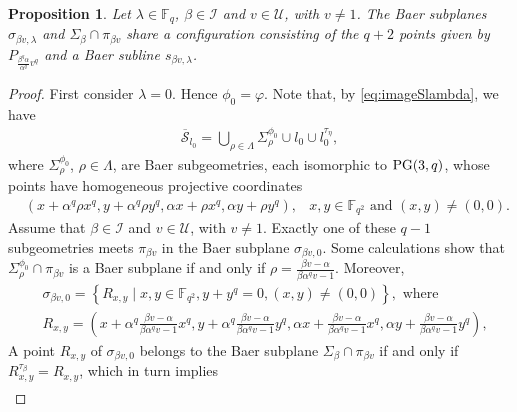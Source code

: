 \documentclass[11pt]{article}
\newtheorem{prop}[theorem]{Proposition}
\theoremstyle{definition}
\numberwithin{equation}{section}
\def\cI{\mathcal I}
\def\cU{\mathcal U}
\def\cS{\mathcal S}
\def\PG{{\rm PG}}
\def\F{{\mathbb F}}
\begin{document}
\begin{prop}\label{prop1}
Let $\lambda \in \F_q$, $\beta \in \cI$ and $v \in \cU$, with $v \ne 1$. The Baer subplanes $\sigma_{\beta v, \lambda}$ and $\Sigma_{\beta} \cap \pi_{\beta v}$ share a configuration consisting of the $q+2$ points given by $P_{\frac{\beta^q \alpha}{\alpha^q} v^q}$ and a Baer subline $s_{\beta v, \lambda}$. 
\end{prop}
\begin{proof}
First consider $\lambda=0$. Hence $\phi_0 = \varphi$. Note that, by \eqref{eq:imageSlambda}, we have 
\begin{align*}
\overline{\cS}_{l_0} = \bigcup_{\rho \in \Lambda} \Sigma_{\rho}^{\phi_{0}} \cup l_0 \cup l_0^{\tau_{\eta}},
\end{align*}
where $\Sigma_{\rho}^{\phi_{0}}$, $\rho \in \Lambda$, are Baer subgeometries, each isomorphic to $\PG(3, q)$, whose points have homogeneous projective coordinates 
\begin{align*}
& \left(x + \alpha^q \rho x^q, y + \alpha^q \rho y^q, \alpha x + \rho x^q, \alpha y + \rho y^q \right), & x, y \in \F_{q^2} \mbox{ and } (x, y) \ne (0, 0). 
\end{align*}
Assume that $\beta \in \cI$ and $v \in \cU$, with $v \ne 1$. Exactly one of these $q-1$ subgeometries meets $\pi_{\beta v}$ in the Baer subplane $\sigma_{\beta v, 0}$. Some calculations show that $\Sigma_{\rho}^{\phi_0} \cap \pi_{\beta v}$ is a Baer subplane if and only if $\rho = \frac{\beta v -\alpha}{\beta \alpha^q v - 1}$. Moreover, 
\begin{align*}
& \sigma_{\beta v, 0} = \left\{ R_{x,y} \mid x, y \in \F_{q^2}, y+ y^q = 0, (x,y) \ne (0,0) \right\}, \mbox{ where } \\
& R_{x,y} = \left(x + \alpha^q \frac{\beta v -\alpha}{\beta \alpha^q v - 1} x^q, y + \alpha^q \frac{\beta v -\alpha}{\beta \alpha^q v - 1} y^q, \alpha x + \frac{\beta v -\alpha}{\beta \alpha^q v - 1} x^q, \alpha y + \frac{\beta v -\alpha}{\beta \alpha^q v - 1} y^q \right),
\end{align*}
A point $R_{x,y}$ of $\sigma_{\beta v, 0}$ belongs to the Baer subplane $\Sigma_{\beta} \cap \pi_{\beta v}$ if and only if $R_{x,y}^{\tau_{\beta}} = R_{x,y}$, which in turn implies 
\begin{align*}

\end{align*}
\end{proof}
\end{document}
